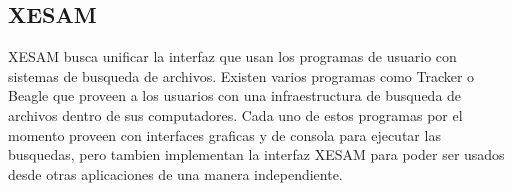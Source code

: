 \subsection{XESAM}

XESAM busca unificar la interfaz que usan los programas de usuario con sistemas de busqueda de archivos. Existen varios programas como Tracker o Beagle que proveen a los usuarios con una infraestructura de busqueda de archivos dentro de sus computadores. Cada uno de estos programas por el momento proveen con interfaces graficas y de consola para ejecutar las busquedas, pero tambien implementan la interfaz XESAM para poder ser usados desde otras aplicaciones de una manera independiente.



